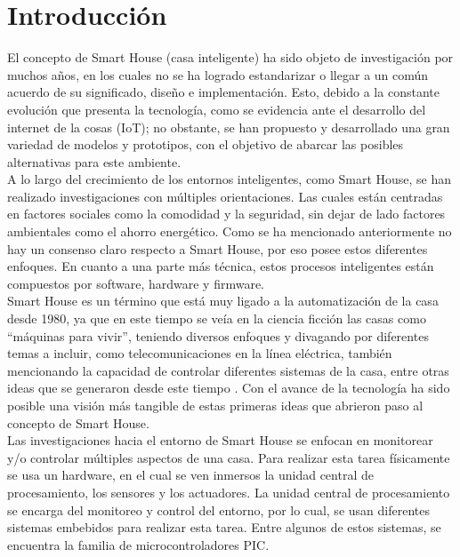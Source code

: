 \chapter{Introducción}


El concepto de Smart House (casa inteligente) ha sido objeto de investigación por muchos años, en los cuales no se ha logrado estandarizar o llegar a un común acuerdo de su significado, diseño e implementación. Esto, debido a la constante evolución que presenta la tecnología, como se evidencia ante el desarrollo del internet de la cosas (IoT); no obstante, se han propuesto y desarrollado una gran variedad de modelos y prototipos, con el objetivo de abarcar las posibles alternativas para este ambiente. \\

A lo largo del crecimiento de los entornos inteligentes, como Smart House, se han realizado investigaciones con múltiples orientaciones. Las cuales están centradas en factores sociales como la comodidad y la seguridad, sin dejar de lado factores ambientales como el ahorro energético. Como se ha mencionado anteriormente no hay un consenso claro respecto a Smart House, por eso posee estos diferentes enfoques. En cuanto a una parte más técnica, estos procesos inteligentes están compuestos por software, hardware y firmware.\\

Smart House es un término que está muy ligado a la automatización de la casa desde 1980, ya que en este tiempo se veía en la ciencia ficción las casas como “máquinas para vivir”, teniendo diversos enfoques y divagando por diferentes temas a incluir, como telecomunicaciones en la línea eléctrica, también mencionando la capacidad de controlar diferentes sistemas de la casa, entre otras ideas que se generaron desde este tiempo \cite{Gross1998}. Con el avance de la tecnología ha sido posible una visión más tangible de estas primeras ideas que abrieron paso al concepto de Smart House.\\


Las investigaciones hacia el entorno de Smart House se enfocan en monitorear y/o controlar múltiples aspectos de una casa. Para realizar esta tarea físicamente se usa un hardware, en el cual se ven inmersos la unidad central de procesamiento, los sensores y los actuadores. La unidad central de procesamiento se encarga del monitoreo y control del entorno, por lo cual, se usan diferentes sistemas embebidos para realizar esta tarea. Entre algunos de estos sistemas, se encuentra la familia de microcontroladores PIC.\\

